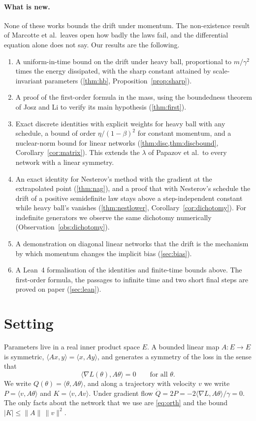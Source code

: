 \documentclass[11pt]{article}
\theoremstyle{remark}
\theoremstyle{definition}
\newcommand{\ip}[2]{\langle #1,#2\rangle}
\begin{document}
\paragraph{What is new.} None of these works bounds the drift under momentum. The non-existence result of Marcotte et al.\ leaves open how badly the laws fail, and the differential equation alone does not say. Our results are the following.

\begin{enumerate}
\item A uniform-in-time bound on the drift under heavy ball, proportional to $m/\gamma^2$ times the energy dissipated, with the sharp constant attained by scale-invariant parameters (\cref{thm:hb}, Proposition~\ref{prop:sharp}).
\item A proof of the first-order formula in the mass, using the boundedness theorem of Josz and Li to verify its main hypothesis (\cref{thm:first}).
\item Exact discrete identities with explicit weights for heavy ball with any schedule, a bound of order $\eta/(1-\beta)^2$ for constant momentum, and a nuclear-norm bound for linear networks (\cref{thm:disc,thm:discbound}, Corollary~\ref{cor:matrix}). This extends the $\lambda$ of Papazov et al.\ to every network with a linear symmetry.
\item An exact identity for Nesterov's method with the gradient at the extrapolated point (\cref{thm:nag}), and a proof that with Nesterov's schedule the drift of a positive semidefinite law stays above a step-independent constant while heavy ball's vanishes (\cref{thm:nestlower}, Corollary~\ref{cor:dichotomy}). For indefinite generators we observe the same dichotomy numerically (Observation~\ref{obs:dichotomy}).
\item A demonstration on diagonal linear networks that the drift is the mechanism by which momentum changes the implicit bias (\cref{sec:bias}).
\item A Lean~4 formalisation of the identities and finite-time bounds above. The first-order formula, the passages to infinite time and two short final steps are proved on paper (\cref{sec:lean}).
\end{enumerate}

\section{Setting}\label{sec:setting}

Parameters live in a real inner product space $E$. A bounded linear map $A:E\to E$ is symmetric, $\ip{Ax}{y}=\ip{x}{Ay}$, and generates a symmetry of the loss in the sense that
\begin{equation}\label{eq:orth}
\ip{\nabla L(\theta)}{A\theta}=0\qquad\text{for all }\theta .
\end{equation}
We write $Q(\theta)=\ip{\theta}{A\theta}$, and along a trajectory with velocity $v$ we write $P=\ip{v}{A\theta}$ and $K=\ip{v}{Av}$. Under gradient flow $\dot Q=2P=-2\ip{\nabla L}{A\theta}/\gamma=0$. The only facts about the network that we use are \eqref{eq:orth} and the bound $|K|\le\|A\|\,\|v\|^2$.
\end{document}
